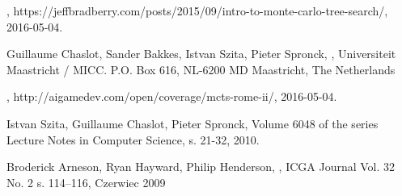 \documentclass[11pt]{aghdpl}
\begin{document}
\begin{thebibliography}{1}
\bibitem{}
\label{bib:mcts_wprowadzenie}
,
\newblock https://jeffbradberry.com/posts/2015/09/intro-to-monte-carlo-tree-search/, 2016-05-04.

\bibitem{}
\label{bib:mcts_opis}
Guillaume Chaslot, Sander Bakkes, Istvan Szita, Pieter Spronck,
,
\newblock Universiteit Maastricht / MICC.
\newblock P.O. Box 616, NL-6200 MD Maastricht, The Netherlands

\bibitem{}
\label{bib:mcts_totalWar}
,
\newblock http://aigamedev.com/open/coverage/mcts-rome-ii/, 2016-05-04.

\bibitem{}
\label{bib:mcts_osadnicy}
Istvan Szita, Guillaume Chaslot, Pieter Spronck,
\newblock Volume 6048 of the series Lecture Notes in Computer Science, s. 21-32, 2010.

\bibitem{}
\label{bib:mcts_hex}
Broderick Arneson, Ryan Hayward, Philip Henderson,
,
\newblock ICGA Journal Vol. 32 No. 2 s. 114–116, Czerwiec 2009

\end{thebibliography}
\end{document}
